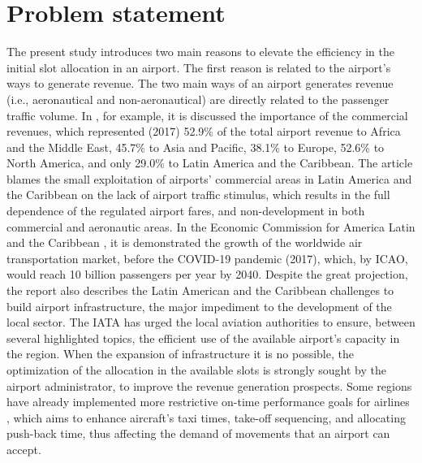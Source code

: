 \section{Problem statement}
\label{probl}

The present study introduces two main reasons to elevate the efficiency in the initial slot allocation in an airport. The first reason is related to the airport's ways to generate revenue. The two main ways of an airport generates revenue (i.e., aeronautical and non-aeronautical) are directly related to the passenger traffic volume. In \cite{graham2009important}, for example, it is discussed the importance of the commercial revenues, which represented (2017) 52.9\% of the total airport revenue to Africa and the Middle East, 45.7\% to Asia and Pacific, 38.1\% to Europe, 52.6\% to North America, and only 29.0\% to Latin America and the Caribbean. The article blames the small exploitation of airports' commercial areas in Latin America and the Caribbean on the lack of airport traffic stimulus, which results in the full dependence of the regulated airport fares, and non-development in both commercial and aeronautic areas.
In the Economic Commission for America Latin and the Caribbean \cite{planzer2019airport}, it is demonstrated the growth of the worldwide air transportation market, before the COVID-19 pandemic (2017), which, by \acrfull{ICAO}, would reach 10 billion passengers per year by 2040. Despite the great projection, the report also describes the Latin American and the Caribbean challenges to build airport infrastructure, the major impediment to the development of the local sector. The \acrfull{IATA} has urged the local aviation authorities to ensure, between several highlighted topics, the efficient use of the available airport’s capacity in the region. When the expansion of infrastructure it is no possible, the optimization of the allocation in the available slots is strongly sought by the airport administrator, to improve the revenue generation prospects. Some regions have already implemented more restrictive on-time performance goals for airlines \cite{ravizza2014aircraft}, which aims to enhance aircraft's taxi times, take-off sequencing, and allocating push-back time, thus affecting the demand of movements that an airport can accept.

